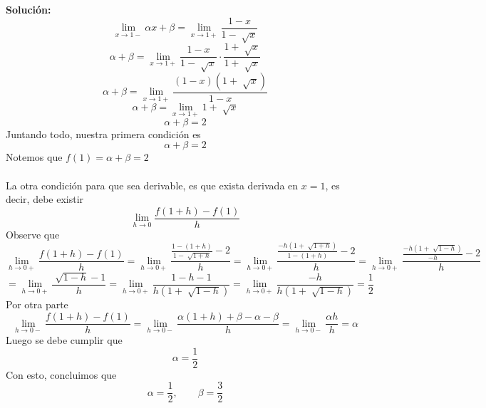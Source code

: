 \documentclass[12pt]{article}
\newenvironment{solucion}
{\begin{mdframed}[backgroundcolor=black!10]
		{\bf Solución:}\\
	}
	{
	\end{mdframed}
}
\newenvironment{preguntas}
{\begin{enumerate}\itemsep12pt
	}
	{
	\end{enumerate}
}
\newcommand{\ra}{\rightarrow}
\begin{document}
\begin{preguntas}
\begin{solucion}
$$\lim\limits_{x\ra 1-} \alpha x + \beta = \lim\limits_{x\ra 1+} \dfrac{1-x}{1-\sqrt[]{x}} $$
$$\alpha + \beta = \lim\limits_{x\ra 1+} \dfrac{1-x}{1-\sqrt[]{x}} \cdot \dfrac{1+\sqrt[]{x}}{1+\sqrt[]{x}} $$
$$\alpha + \beta = \lim\limits_{x\ra 1+} \dfrac{(1-x)(1+\sqrt[]{x})}{1-x}$$
$$\alpha + \beta = \lim\limits_{x\ra 1+} 1+\sqrt[]{x}$$
$$\alpha + \beta = 2$$
Juntando todo, nuestra primera condición es
$$\alpha + \beta = 2$$
Notemos que $f(1) = \alpha + \beta = 2$\\
\\
La otra condición para que sea derivable, es que exista derivada en $x=1$, es decir, debe existir
$$\lim\limits_{h\ra 0} \dfrac{f(1+h) - f(1)}{h}$$
Observe que
\small$$\lim\limits_{h\ra 0+} \dfrac{f(1+h) - f(1)}{h} = 
\lim\limits_{h\ra 0+} \dfrac{\frac{1-(1+h)}{1-\sqrt[]{1+h}}- 2}{h} = 
\lim\limits_{h\ra 0+} \dfrac{\frac{-h(1+\sqrt[]{1+h})}{1-(1+h)}- 2}{h} = 
\lim\limits_{h\ra 0+} \dfrac{\frac{-h(1+\sqrt[]{1-h})}{-h}- 2}{h}  $$
$$= 
\lim\limits_{h\ra 0+} \dfrac{\sqrt[]{1-h} - 1}{h} = 
\lim\limits_{h\ra 0+} \dfrac{1-h - 1}{h(1+\sqrt[]{1-h})} = 
\lim\limits_{h\ra 0+} \dfrac{-h}{h(1+\sqrt[]{1-h})} =
\dfrac{1}{2}$$
Por otra parte
$$\lim\limits_{h\ra 0-} \dfrac{f(1+h) - f(1)}{h} = 
\lim\limits_{h\ra 0-} \dfrac{\alpha(1+h) +\beta - \alpha - \beta}{h} = 
\lim\limits_{h\ra 0-} \dfrac{\alpha h }{h} =
\alpha
$$
Luego se debe cumplir que
$$\alpha = \dfrac{1}{2}$$
Con esto, concluimos que
$$\alpha = \dfrac{1}{2}, \qquad \beta = \dfrac{3}{2}$$
\end{solucion}
\end{preguntas}
\end{document}
